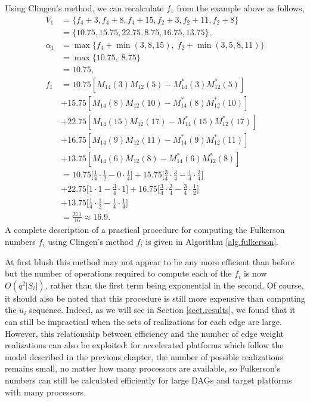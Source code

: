 \documentclass[12pt]{article}
\begin{document}
Using Clingen's method, we can recalculate $f_1$ from the example above as follows, 
\begin{align*}
V_1 &= \{ f_4 + 3, f_4 + 8, f_4 + 15, f_2 + 3, f_2 + 11, f_2 + 8 \} \\
&= \{ 10.75, 15.75, 22.75, 8.75, 16.75, 13.75 \}, \\
\alpha_1 &= \max \{ f_4 + \min(3, 8, 15), \; f_2 + \min(3, 5, 8, 11)  \} \\
&= \max \{ 10.75, \; 8.75  \} \\
&= 10.75, \\
f_1 &= 10.75[M_{14}(3)M_{12}(5) - M_{14}^*(3)M_{12}^*(5)] \\
&+ 15.75[M_{14}(8)M_{12}(10) - M_{14}^*(8)M_{12}^*(10)] \\ 
&+ 22.75[M_{14}(15)M_{12}(17) - M_{14}^*(15)M_{12}^*(17)] \\
&+ 16.75[M_{14}(9)M_{12}(11) - M_{14}^*(9)M_{12}^*(11)] \\
&+ 13.75[M_{14}(6)M_{12}(8) - M_{14}^*(6)M_{12}^*(8)] \\
&= 10.75 \bigg[ \frac{1}{4} \cdot \frac{1}{2} - 0 \cdot \frac{1}{4} \bigg] + 15.75 \bigg[ \frac{3}{4} \cdot \frac{3}{4} - \frac{1}{4} \cdot \frac{3}{4} \bigg] \\
&+ 22.75 \bigg[ 1 \cdot 1 - \frac{3}{4} \cdot 1 \bigg] + 16.75 \bigg[ \frac{3}{4} \cdot \frac{3}{4} - \frac{3}{4} \cdot \frac{1}{2} \bigg] \\
&+ 13.75 \bigg[ \frac{1}{4} \cdot \frac{1}{2} - \frac{1}{4} \cdot \frac{1}{4} \bigg] \\
&= \frac{271}{16} \approx 16.9.
\end{align*}
A complete description of a practical procedure for computing the Fulkerson numbers $f_i$ using Clingen's method $f_i$ is given in Algorithm \ref{alg.fulkerson}.

At first blush this method may not appear to be any more efficient than before but the number of operations required to compute each of the $f_i$ is now $O(q^2 |S_i|)$, rather than the first term being exponential in the second. Of course, it should also be noted that this procedure is still more expensive than computing the $u_i$ sequence. Indeed, as we will see in Section \ref{sect.results}, we found that it can still be impractical when the sets of realizations for each edge are large. However, this relationship between efficiency and the number of edge weight realizations can also be exploited: for accelerated platforms which follow the model described in the previous chapter, the number of possible realizations remains small, no matter how many processors are available, so Fulkerson's numbers can still be calculated efficiently for large DAGs and target platforms with many processors.   
\end{document}

